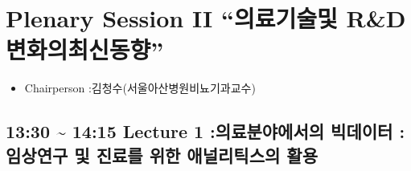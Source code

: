 \documentclass[]{book}
\providecommand{\tightlist}{%
  \setlength{\itemsep}{0pt}\setlength{\parskip}{0pt}}
\begin{document}
\section{\texorpdfstring{Plenary Session II ``의료기술및 R\&D
변화의최신동향''}{Plenary Session II 의료기술및 R\&D 변화의최신동향}}\label{plenary-session-ii--rd-}

\begin{itemize}
\tightlist
\item
  Chairperson :김청수(서울아산병원비뇨기과교수)
\end{itemize}

\subsection{13:30 \textasciitilde{} 14:15 Lecture 1 :의료분야에서의
빅데이터 :임상연구 및 진료를 위한 애널리틱스의
활용}\label{lecture-1--------}
\end{document}
